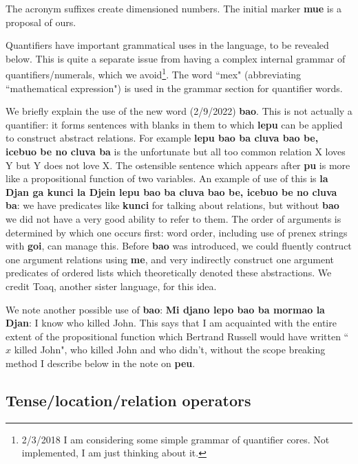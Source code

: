 \documentclass[12pt]{book}
\begin{document}
The acronym suffixes create dimensioned numbers.   The initial marker {\bf mue} is a proposal of ours.

Quantifiers have important grammatical uses in the language, to be revealed below.   This is quite a separate issue from having a complex internal grammar of quantifiers/numerals, which we avoid\footnote{2/3/2018 I am considering some simple grammar of quantifier cores.  Not implemented, I am just thinking about it.}.   The word ``mex" (abbreviating ``mathematical expression") is used in the grammar section for quantifier words.

We briefly explain the use of the new word (2/9/2022) {\bf bao}.  This is not actually a quantifier:  it forms sentences with blanks in them to which {\bf lepu} can be applied to construct abstract relations.  For example {\bf lepu bao ba cluva bao be, icebuo be no cluva ba} is the unfortunate but all too common relation X loves Y but Y does not love X.  The ostensible sentence which appears after {\bf pu} is more like a propositional function of two variables.  An example of use of this is {\bf la Djan ga kunci la Djein lepu bao ba cluva bao be, icebuo be no cluva ba}:  we have predicates like {\bf kunci} for talking about relations, but without {\bf bao} we did not have a very good ability to refer to them.  The order of arguments is determined by which one occurs first:  word order, including use of prenex strings with {\bf goi}, can manage this.  Before {\bf bao} was introduced, we could fluently contruct one argument relations using {\bf me}, and very indirectly construct one argument predicates of ordered lists which theoretically denoted these abstractions.  We credit Toaq, another sister language, for this idea.

We note another possible use of {\bf bao}:  {\bf Mi djano lepo bao ba mormao la Djan}:  I know who killed John.  This says that I am acquainted with the entire extent of the propositional function which Bertrand Russell would have written ``$\hat x$ killed John", who killed John and who didn't, without the scope breaking method I describe below in the note on {\bf peu}.

\subsection{Tense/location/relation operators}
\end{document}
